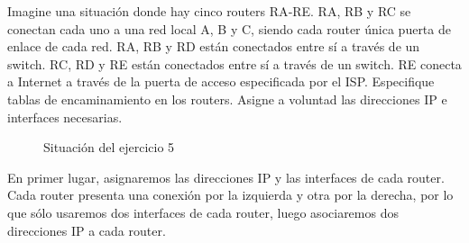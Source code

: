 \begin{ejercicio}
    Imagine una situación donde hay cinco routers RA‐RE\@. RA, RB y RC se conectan cada uno a una red local A, B y C, siendo cada router única puerta de enlace de cada red. RA, RB y RD están conectados entre sí a través de un switch. RC, RD y RE están conectados entre sí a través de un switch. RE conecta a Internet a través de la puerta de acceso especificada por el ISP\@. Especifique tablas de encaminamiento en los routers. Asigne a voluntad las direcciones IP e interfaces necesarias.
    \begin{figure}[H]
    \centering
    \caption{Situación del ejercicio 5}
    \end{figure}

    En primer lugar, asignaremos las direcciones IP y las interfaces de cada router. Cada router presenta una conexión por la izquierda y otra por la derecha, por lo que sólo usaremos dos interfaces de cada router, luego asociaremos dos direcciones IP a cada router.


\end{ejercicio}
